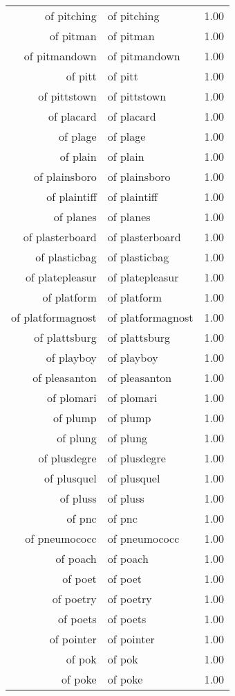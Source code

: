 \begin{table}[ht]
\begin{tabular}{rlr}
  of pitching & of pitching & 1.00 \\ 
  of pitman & of pitman & 1.00 \\ 
  of pitmandown & of pitmandown & 1.00 \\ 
  of pitt & of pitt & 1.00 \\ 
  of pittstown & of pittstown & 1.00 \\ 
  of placard & of placard & 1.00 \\ 
  of plage & of plage & 1.00 \\ 
  of plain & of plain & 1.00 \\ 
  of plainsboro & of plainsboro & 1.00 \\ 
  of plaintiff & of plaintiff & 1.00 \\ 
  of planes & of planes & 1.00 \\ 
  of plasterboard & of plasterboard & 1.00 \\ 
  of plasticbag & of plasticbag & 1.00 \\ 
  of platepleasur & of platepleasur & 1.00 \\ 
  of platform & of platform & 1.00 \\ 
  of platformagnost & of platformagnost & 1.00 \\ 
  of plattsburg & of plattsburg & 1.00 \\ 
  of playboy & of playboy & 1.00 \\ 
  of pleasanton & of pleasanton & 1.00 \\ 
  of plomari & of plomari & 1.00 \\ 
  of plump & of plump & 1.00 \\ 
  of plung & of plung & 1.00 \\ 
  of plusdegre & of plusdegre & 1.00 \\ 
  of plusquel & of plusquel & 1.00 \\ 
  of pluss & of pluss & 1.00 \\ 
  of pnc & of pnc & 1.00 \\ 
  of pneumococc & of pneumococc & 1.00 \\ 
  of poach & of poach & 1.00 \\ 
  of poet & of poet & 1.00 \\ 
  of poetry & of poetry & 1.00 \\ 
  of poets & of poets & 1.00 \\ 
  of pointer & of pointer & 1.00 \\ 
  of pok & of pok & 1.00 \\ 
  of poke & of poke & 1.00 \\ 

\end{tabular}
\end{table}
